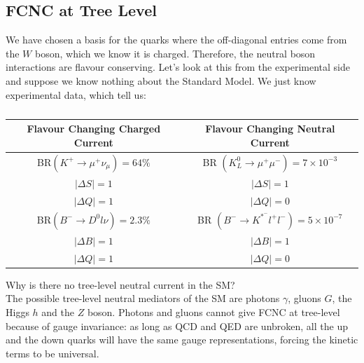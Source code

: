 \documentclass[../main.tex]{subfiles}
\begin{document}
\subsection{FCNC at Tree Level}
We have chosen a basis for the quarks where the off-diagonal entries come from the $W$ boson, which we know it is charged. Therefore, the neutral boson interactions are flavour conserving. Let's look at this from the experimental side and suppose we know nothing about the Standard Model. We just know experimental data, which tell us:
\begin{table}[h]
    \centering
    \begin{tabular}{c|c}
    Flavour Changing Charged Current & Flavour Changing Neutral Current \\
    \hline\hline
    BR$(K^+\xrightarrow[]{}\mu^+\nu_\mu)=64\%$ & BR $(K_L^0\xrightarrow[]{}\mu^+\mu^-)=7\times10^{-3}$\\
    $|\Delta S|=1$ & $|\Delta S|=1$\\
    $|\Delta Q|=1$ & $|\Delta Q|=0$\\
    \hline
    BR$(B^-\xrightarrow[]{}D^0l\nu)=2.3\%$ & BR $(B^-\xrightarrow[]{}K^*^-l^+l^-)=5\times10^{-7}$\\
    $|\Delta B|=1$ & $|\Delta B|=1$\\
    $|\Delta Q|=1$ & $|\Delta Q|=0$\\
    \hline
    \end{tabular}
    \caption*{}
    \label{tab:my_label}
\end{table}
\newline
Why is there no tree-level neutral current in the SM?\\
The possible tree-level neutral mediators of the SM are photons $\gamma$, gluons $G$, the Higgs $h$ and the $Z$ boson. Photons and gluons cannot give FCNC at tree-level because of gauge invariance: as long as QCD and QED are unbroken, all the up and the down quarks will have the same gauge representations, forcing the kinetic terms to be universal.
\end{document}

